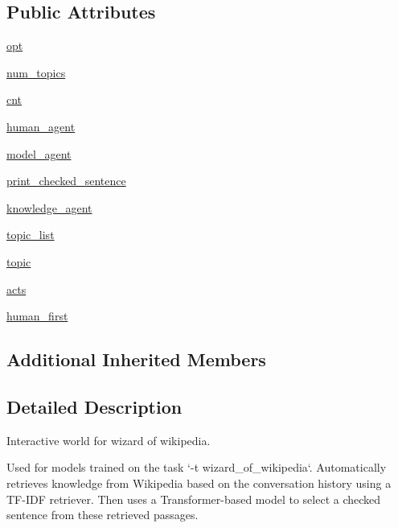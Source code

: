 \subsection*{Public Attributes}
\begin{DoxyCompactItemize}
\item 
\hyperlink{classparlai_1_1tasks_1_1wizard__of__wikipedia_1_1worlds_1_1InteractiveWorld_a47e0bc96c0be028cc4732a499662040d}{opt}
\item 
\hyperlink{classparlai_1_1tasks_1_1wizard__of__wikipedia_1_1worlds_1_1InteractiveWorld_a32f2d277a7892c9e8c7c64c12a8f4ba7}{num\+\_\+topics}
\item 
\hyperlink{classparlai_1_1tasks_1_1wizard__of__wikipedia_1_1worlds_1_1InteractiveWorld_ac89fdf4af0e037452e4e965560b68eea}{cnt}
\item 
\hyperlink{classparlai_1_1tasks_1_1wizard__of__wikipedia_1_1worlds_1_1InteractiveWorld_a54ecd8d0f7c5dd064d0c2b511f9ac03b}{human\+\_\+agent}
\item 
\hyperlink{classparlai_1_1tasks_1_1wizard__of__wikipedia_1_1worlds_1_1InteractiveWorld_abc5413fa516f7fb0cc4e0c52d918d572}{model\+\_\+agent}
\item 
\hyperlink{classparlai_1_1tasks_1_1wizard__of__wikipedia_1_1worlds_1_1InteractiveWorld_a8e347c355d835228d970a4e8464dad1e}{print\+\_\+checked\+\_\+sentence}
\item 
\hyperlink{classparlai_1_1tasks_1_1wizard__of__wikipedia_1_1worlds_1_1InteractiveWorld_ab9fa4bee853c91a06ab29dff852dd95e}{knowledge\+\_\+agent}
\item 
\hyperlink{classparlai_1_1tasks_1_1wizard__of__wikipedia_1_1worlds_1_1InteractiveWorld_ad323b2b928a31a0b048059a1569ae8f2}{topic\+\_\+list}
\item 
\hyperlink{classparlai_1_1tasks_1_1wizard__of__wikipedia_1_1worlds_1_1InteractiveWorld_ad248b70f56a67f58e7799eb126315169}{topic}
\item 
\hyperlink{classparlai_1_1tasks_1_1wizard__of__wikipedia_1_1worlds_1_1InteractiveWorld_af926c611144cdc54b7f1c631286b388b}{acts}
\item 
\hyperlink{classparlai_1_1tasks_1_1wizard__of__wikipedia_1_1worlds_1_1InteractiveWorld_a8a0ba61c930502f811dd033a6e52c327}{human\+\_\+first}
\end{DoxyCompactItemize}
\subsection*{Additional Inherited Members}


\subsection{Detailed Description}
\begin{DoxyVerb}Interactive world for wizard of wikipedia.

Used for models trained on the task `-t wizard_of_wikipedia`. Automatically
retrieves knowledge from Wikipedia based on the conversation history using a TF-IDF
retriever. Then uses a Transformer-based model to select a checked sentence from
these retrieved passages.
\end{DoxyVerb}
 

